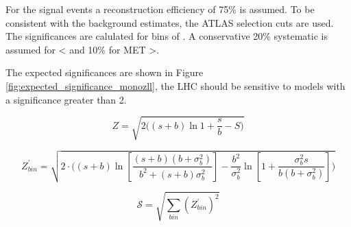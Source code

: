 For the signal events a reconstruction efficiency of 75\% is assumed.  To be consistent with the background estimates, the ATLAS selection cuts are used.  The significances are calulated for bins of \MET.  A conservative 20\% systematic is assumed for \MET < and 10\% for MET >.

The expected significances are shown  in Figure \ref{fig:expected_significance_monozll}, the LHC should be sensitive to models with a significance greater than 2.

\begin{equation}
\label{eq:significance}
Z = \sqrt{2 \bigg( (s+b) \ln{1 + \frac{s}{b}} - S \bigg) }
\end{equation}


\begin{equation}
\label{eq:significance_wsyst}
Z^\prime_{bin} = \sqrt{ 2 \cdot \bigg( (s+b) \ln[\frac{ (s+b) (b+\sigma_b^2) } {b^2 + (s+b) \sigma_b^2} ]- \frac{b^2}{\sigma_b^2} \ln[1 + \frac{\sigma_b^2 s}{b(b+\sigma_b^2)} ] \bigg) }
\end{equation}

\begin{equation}
\mathcal{S} = \sqrt{\sum_{bin} (Z^\prime_{bin})^2}
\end{equation}


